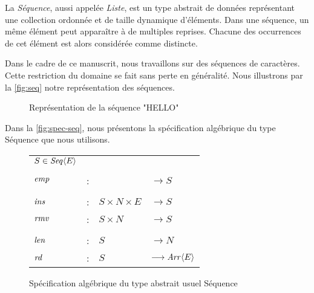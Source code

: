 La \emph{Séquence}, aussi appelée \emph{Liste}, est un type abstrait de données représentant une collection ordonnée et de taille dynamique d'éléments.
Dans une séquence, un même élément peut apparaître à de multiples reprises.
Chacune des occurrences de cet élément est alors considérée comme distincte.

Dans le cadre de ce manuscrit, nous travaillons sur des séquences de caractères.
Cette restriction du domaine se fait sans perte en généralité.
Nous illustrons par la \autoref{fig:seq} notre représentation des séquences.

\begin{figure}[!ht]

  \centering
  \caption{Représentation de la séquence "HELLO"}
  \label{fig:seq}
\end{figure}

Dans la \autoref{fig:spec-seq}, nous présentons la spécification algébrique du type Séquence que nous utilisons.

\begin{figure}[!ht]

  \centering
    \begin{tabular}{llll}
      $S \in \mathit{Seq}\langle E \rangle$ & & & \\
      \\
      $\mathit{emp}$ & : &                       & $\longrightarrow S$   \\
      \\
      $\mathit{ins}$ & : & $S \times N \times E$ & $\longrightarrow S$   \\
      $\mathit{rmv}$ & : & $S \times N$          & $\longrightarrow S$   \\
      \\
      $\mathit{len}$ & : & $S$                   & $\longrightarrow N$   \\
      $\mathit{rd}$  & : & $S$                   & $\longrightarrow \mathit{Arr}\langle E \rangle$ \\
    \end{tabular}
  \caption{Spécification algébrique du type abstrait usuel Séquence}
  \label{fig:spec-seq}
\end{figure}

